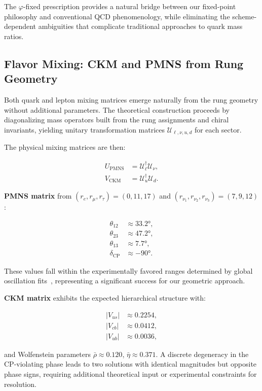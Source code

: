 \documentclass[%
amsmath,amssymb,
aps,
prb,
floatfix,
twocolumn
]{revtex4-2}
\begin{document}
The $\varphi$-fixed prescription provides a natural bridge between our fixed-point philosophy and conventional QCD phenomenology, while eliminating the scheme-dependent ambiguities that complicate traditional approaches to quark mass ratios.

\subsection{Flavor Mixing: CKM and PMNS from Rung Geometry}
\label{subsec:mixing_results}

Both quark and lepton mixing matrices emerge naturally from the rung geometry without additional parameters. The theoretical construction proceeds by diagonalizing mass operators built from the rung assignments and chiral invariants, yielding unitary transformation matrices $\mathcal{U}_{\ell,\nu,u,d}$ for each sector.

The physical mixing matrices are then:

\begin{align}
U_{\text{PMNS}} &= \mathcal{U}_\ell^\dagger \mathcal{U}_\nu, \\
V_{\text{CKM}} &= \mathcal{U}_u^\dagger \mathcal{U}_d.
\end{align}

\textbf{PMNS matrix} from $(r_e, r_\mu, r_\tau) = (0, 11, 17)$ and $(r_{\nu_1}, r_{\nu_2}, r_{\nu_3}) = (7, 9, 12)$:

\begin{align}
\theta_{12} &\approx 33.2°, \\
\theta_{23} &\approx 47.2°, \\
\theta_{13} &\approx 7.7°, \\
\delta_{\text{CP}} &\approx -90°.
\end{align}

These values fall within the experimentally favored ranges determined by global oscillation fits~\cite{NuFIT52}, representing a significant success for our geometric approach.

\textbf{CKM matrix} exhibits the expected hierarchical structure with:

\begin{align}
|V_{us}| &\approx 0.2254, \\
|V_{cb}| &\approx 0.0412, \\
|V_{ub}| &\approx 0.0036,
\end{align}

and Wolfenstein parameters $\bar{\rho} \approx 0.120$, $\bar{\eta} \approx 0.371$. A discrete degeneracy in the CP-violating phase leads to two solutions with identical magnitudes but opposite phase signs, requiring additional theoretical input or experimental constraints for resolution.
\end{document}
